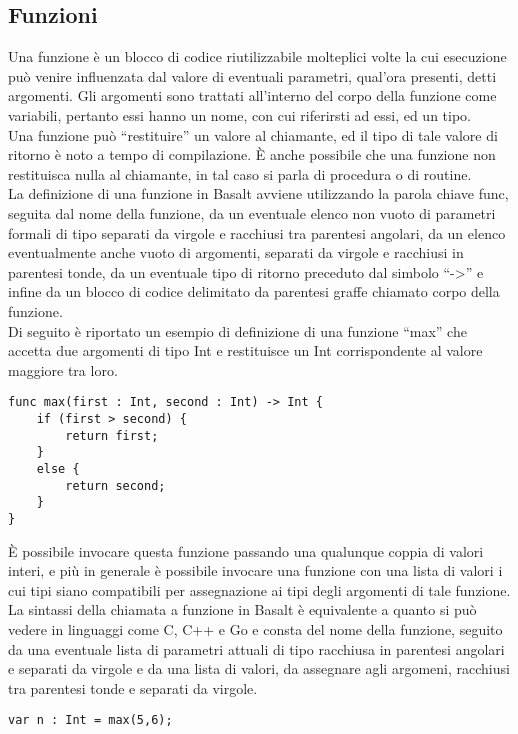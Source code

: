 \subsection{Funzioni}
Una funzione è un blocco di codice riutilizzabile molteplici volte la cui esecuzione può venire 
influenzata dal valore di eventuali parametri, qual’ora presenti, detti argomenti. Gli argomenti sono trattati all'interno 
del corpo della funzione come variabili, pertanto essi hanno un nome, con cui riferirsti ad essi, ed un tipo.\\

Una funzione può “restituire” un valore al chiamante, ed il tipo di tale valore di ritorno 
è noto a tempo di compilazione. È anche possibile che una funzione 
non restituisca nulla al chiamante, in tal caso si parla di procedura o di routine. \\

La definizione di una funzione in Basalt avviene utilizzando la parola chiave func, seguita 
dal nome della funzione, da un eventuale elenco non vuoto di parametri 
formali di tipo separati da virgole e racchiusi tra parentesi angolari, 
da un elenco eventualmente anche vuoto di argomenti, separati da virgole e 
racchiusi in parentesi tonde, da un eventuale tipo di ritorno preceduto 
dal simbolo “->” e infine da un blocco di codice delimitato da parentesi graffe 
chiamato corpo della funzione. \\ 

Di seguito è riportato un esempio di definizione di una funzione “max” che accetta 
due argomenti di tipo Int e restituisce un Int corrispondente al valore maggiore tra loro.

\vspace{0.5cm}
\begin{lstlisting}[frame=single]
func max(first : Int, second : Int) -> Int {
    if (first > second) {
        return first; 
    }
    else {
        return second;
    }
}
\end{lstlisting}
\vspace{0.5cm}

È possibile invocare questa funzione passando una qualunque coppia di valori interi, 
e più in generale è possibile invocare una funzione con una lista di valori i cui tipi 
siano compatibili per assegnazione ai tipi degli argomenti di tale funzione. La sintassi 
della chiamata a funzione in Basalt è equivalente a quanto si può vedere in linguaggi 
come C, C++ e Go e consta del nome della funzione, seguito da una eventuale lista di 
parametri attuali di tipo racchiusa in parentesi angolari e separati da virgole e 
da una lista di valori, da assegnare agli argomeni, racchiusi tra parentesi tonde 
e separati da virgole.

\vspace{0.5cm}
\begin{lstlisting}[frame=single]
var n : Int = max(5,6);
\end{lstlisting}
\vspace{0.5cm}
\newpage

